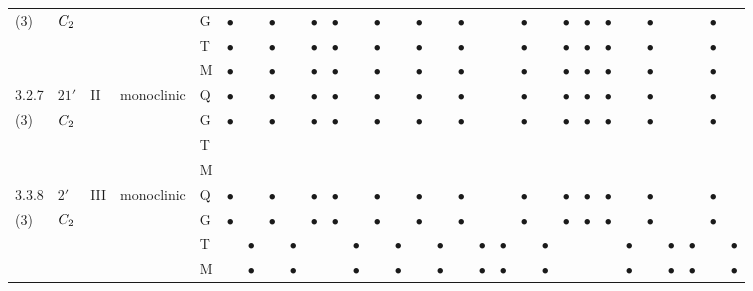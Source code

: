 \documentclass[fleqn,9pt,landscape]{jsarticle}
\begin{document}
\begin{longtable}{lllll|l|lll|ll|lll|l|lll|lll|l|ll|lll|lll}
(3) & $C_{\rm 2}$ &  &  & G & $\bullet$ &  & $\bullet$ &  & $\bullet$ & $\bullet$ &  & $\bullet$ &  & $\bullet$ &  & $\bullet$ &  &  & $\bullet$ &  & $\bullet$ & $\bullet$ & $\bullet$ &  & $\bullet$ &  &  & $\bullet$ &  \\
 &  &  &  & T & $\bullet$ &  & $\bullet$ &  & $\bullet$ & $\bullet$ &  & $\bullet$ &  & $\bullet$ &  & $\bullet$ &  &  & $\bullet$ &  & $\bullet$ & $\bullet$ & $\bullet$ &  & $\bullet$ &  &  & $\bullet$ &  \\
 &  &  &  & M & $\bullet$ &  & $\bullet$ &  & $\bullet$ & $\bullet$ &  & $\bullet$ &  & $\bullet$ &  & $\bullet$ &  &  & $\bullet$ &  & $\bullet$ & $\bullet$ & $\bullet$ &  & $\bullet$ &  &  & $\bullet$ &  \\ \hline
3.2.7 & \texttt{$21'$} & II & monoclinic & Q & $\bullet$ &  & $\bullet$ &  & $\bullet$ & $\bullet$ &  & $\bullet$ &  & $\bullet$ &  & $\bullet$ &  &  & $\bullet$ &  & $\bullet$ & $\bullet$ & $\bullet$ &  & $\bullet$ &  &  & $\bullet$ &  \\
(3) & $C_{\rm 2}$ &  &  & G & $\bullet$ &  & $\bullet$ &  & $\bullet$ & $\bullet$ &  & $\bullet$ &  & $\bullet$ &  & $\bullet$ &  &  & $\bullet$ &  & $\bullet$ & $\bullet$ & $\bullet$ &  & $\bullet$ &  &  & $\bullet$ &  \\
 &  &  &  & T &  &  &  &  &  &  &  &  &  &  &  &  &  &  &  &  &  &  &  &  &  &  &  &  &  \\
 &  &  &  & M &  &  &  &  &  &  &  &  &  &  &  &  &  &  &  &  &  &  &  &  &  &  &  &  &  \\ \hline
3.3.8 & \texttt{$2'$} & III & monoclinic & Q & $\bullet$ &  & $\bullet$ &  & $\bullet$ & $\bullet$ &  & $\bullet$ &  & $\bullet$ &  & $\bullet$ &  &  & $\bullet$ &  & $\bullet$ & $\bullet$ & $\bullet$ &  & $\bullet$ &  &  & $\bullet$ &  \\
(3) & $C_{\rm 2}$ &  &  & G & $\bullet$ &  & $\bullet$ &  & $\bullet$ & $\bullet$ &  & $\bullet$ &  & $\bullet$ &  & $\bullet$ &  &  & $\bullet$ &  & $\bullet$ & $\bullet$ & $\bullet$ &  & $\bullet$ &  &  & $\bullet$ &  \\
 &  &  &  & T &  & $\bullet$ &  & $\bullet$ &  &  & $\bullet$ &  & $\bullet$ &  & $\bullet$ &  & $\bullet$ & $\bullet$ &  & $\bullet$ &  &  &  & $\bullet$ &  & $\bullet$ & $\bullet$ &  & $\bullet$ \\
 &  &  &  & M &  & $\bullet$ &  & $\bullet$ &  &  & $\bullet$ &  & $\bullet$ &  & $\bullet$ &  & $\bullet$ & $\bullet$ &  & $\bullet$ &  &  &  & $\bullet$ &  & $\bullet$ & $\bullet$ &  & $\bullet$ \\ \hline

\end{longtable}
\end{document}
